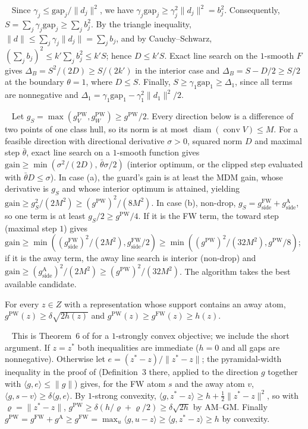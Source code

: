 \documentclass{opt2026}   %
\renewenvironment{proof}[1][]{\par\noindent{\bfseries\upshape Proof#1.}\ }{\jmlrQED}
\newcommand{\conv}{\operatorname{conv}}
\newcommand{\ip}[2]{\langle #1, #2 \rangle}
\newcommand{\norm}[1]{\lVert #1 \rVert}
\newcommand{\gFW}{g^{\mathrm{FW}}}
\newcommand{\gA}{g^{\mathrm{A}}}
\newcommand{\gPW}{g^{\mathrm{PW}}}
\begin{document}
\begin{proof}[ of Lemma~\ref{lem:block}]
Since $\gamma_j\le\mathrm{gap}_j/\norm{d_j}^2$, we have
$\gamma_j\mathrm{gap}_j\ge\gamma_j^2\norm{d_j}^2=b_j^2$. Consequently,
$S=\sum_j\gamma_j\mathrm{gap}_j\ge\sum_jb_j^2$. By the triangle
inequality, $\norm d\le\sum_j\gamma_j\norm{d_j}=\sum_jb_j$, and by
Cauchy--Schwarz, $(\sum_jb_j)^2\le k'\sum_jb_j^2\le k'S$; hence
$D\le k'S$. Exact line search on the $1$-smooth $F$ gives
$\Delta_B=S^2/(2D)\ge S/(2k')$ in the interior case and
$\Delta_B=S-D/2\ge S/2$ at the boundary $\theta=1$, where $D\le S$. Finally,
$S\ge\gamma_1\mathrm{gap}_1\ge\Delta_1$, since all terms
are nonnegative and
$\Delta_1=\gamma_1\mathrm{gap}_1-\gamma_1^2\norm{d_1}^2/2$.
\end{proof}

\begin{proof}[ of Lemma~\ref{lem:good}]
Let $g_S=\max(\gPW_V,\gPW_W)\ge\gPW/2$. Every direction below is a
difference of two points of one class hull, so its norm is at most
$\operatorname{diam}(\conv V)\le M$. For a feasible direction with
directional derivative $\sigma>0$, squared norm $D$ and maximal step
$\bar\theta$, exact line search on a $1$-smooth function gives
$\mathrm{gain}\ge\min(\sigma^2/(2D),\,\bar\theta\sigma/2)$ (interior
optimum, or the clipped step evaluated with $\bar\theta D\le\sigma$).
In case (a), the guard's gain is at least the MDM gain, whose
derivative is $g_S$ and whose interior optimum is attained, yielding
$\mathrm{gain}\ge g_S^2/(2M^2)\ge(\gPW)^2/(8M^2)$.
In case (b), non-drop, $g_S=\gFW_{\text{side}}+\gA_{\text{side}}$, so
one term is at least $g_S/2\ge\gPW/4$. If it is the FW term, the toward step
(maximal step $1$) gives
$\mathrm{gain}\ge\min((\gFW_{\text{side}})^2/(2M^2),\gFW_{\text{side}}/2)\ge\min((\gPW)^2/(32M^2),\gPW/8)$;
if it is the away term, the away line search is interior (non-drop) and
$\mathrm{gain}\ge(\gA_{\text{side}})^2/(2M^2)\ge(\gPW)^2/(32M^2)$. The
algorithm takes the best available candidate.
\end{proof}

\begin{lemma}[Geometric strong convexity; {\cite[Thm.~6]{lj2015}} with
$\mu=1$]\label{lem:gsc}
For every $z\in Z$ with a representation whose support contains an away
atom, $\gPW(z)\ge\delta\sqrt{2h(z)}$ and $\gPW(z)\ge\gFW(z)\ge h(z)$.
\end{lemma}
\begin{proof}
This is Theorem~6 of \cite{lj2015} for a $1$-strongly convex objective;
we include the short argument. If $z=z^*$ both inequalities are
immediate ($h=0$ and all gaps are nonnegative). Otherwise let
$e=(z^*-z)/\norm{z^*-z}$; the pyramidal-width inequality in the proof
of \cite[Thm.~6]{lj2015} (Definition~3 there, applied to the direction
$g$ together with $\ip{g}{e}\le\norm g$) gives, for the FW atom $s$ and
the away atom $v$, $\ip{g}{s-v}\ge\delta\ip{g}{e}$. By $1$-strong convexity,
$\ip{g}{z^*-z}\ge h+\tfrac12\norm{z^*-z}^2$, so with
$\varrho=\norm{z^*-z}$,
$\gPW\ge\delta(h/\varrho+\varrho/2)\ge\delta\sqrt{2h}$ by AM--GM. Finally
$\gPW=\gFW+\gA\ge\gFW=\max_u\ip{g}{u-z}\ge\ip{g}{z^*-z}\ge h$ by
convexity.
\end{proof}
\end{document}
